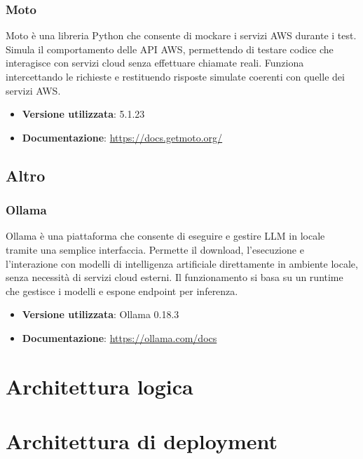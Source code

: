 \documentclass[a4paper,12pt]{article}
\begin{document}
\subsubsection{Moto}
Moto è una libreria Python che consente di mockare i servizi AWS durante i test. Simula il comportamento delle API AWS, permettendo di testare codice che interagisce con servizi cloud senza effettuare chiamate reali. Funziona intercettando le richieste e restituendo risposte simulate coerenti con quelle dei servizi AWS.
\begin{itemize}
    \item \textbf{Versione utilizzata}: 5.1.23
    \item \textbf{Documentazione}: \url{https://docs.getmoto.org/}
\end{itemize}

\subsection{Altro} \label{subsec:altro}

\subsubsection{Ollama}
Ollama è una piattaforma che consente di eseguire e gestire LLM in locale tramite una semplice interfaccia. Permette il download, l’esecuzione e l’interazione con modelli di intelligenza artificiale direttamente in ambiente locale, senza necessità di servizi cloud esterni. Il funzionamento si basa su un runtime che gestisce i modelli e espone endpoint per inferenza.
\begin{itemize}
    \item \textbf{Versione utilizzata}: Ollama 0.18.3
    \item \textbf{Documentazione}: \url{https://ollama.com/docs}
\end{itemize}

\section{Architettura logica} \label{subsec:architettura_logica}

\section{Architettura di deployment} \label{subsec:architettura_deployment}
\end{document}
